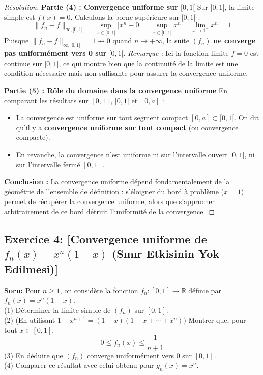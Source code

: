 \documentclass[12pt,a4paper]{report}
\begin{document}
\begin{proof}[Résolution]
\textbf{Partie (4) : Convergence uniforme sur $[0, 1[$}
Sur $[0, 1[$, la limite simple est $f(x) = 0$.
Calculons la borne supérieure sur $[0, 1[$ :
\[ \|f_n - f\|_{\infty, [0, 1[} = \sup_{x \in [0, 1[} |x^n - 0| = \sup_{x \in [0, 1[} x^n = \lim_{x \to 1^-} x^n = 1 \]
Puisque $\|f_n - f\|_{\infty, [0, 1[} = 1 \not\to 0$ quand $n \to +\infty$, la suite $(f_n)$ \textbf{ne converge pas uniformément vers 0 sur $[0, 1[$}.
\textit{Remarque :} Ici la fonction limite $f=0$ est continue sur $[0, 1[$, ce qui montre bien que la continuité de la limite est une condition nécessaire mais non suffisante pour assurer la convergence uniforme.

\textbf{Partie (5) : Rôle du domaine dans la convergence uniforme}
En comparant les résultats sur $[0, 1]$, $[0, 1[$ et $[0, a]$ :
\begin{itemize}
    \item La convergence est uniforme sur tout segment compact $[0, a] \subset [0, 1[$. On dit qu'il y a \textbf{convergence uniforme sur tout compact} (ou convergence compacte).
    \item En revanche, la convergence n'est uniforme ni sur l'intervalle ouvert $[0, 1[$, ni sur l'intervalle fermé $[0, 1]$.
\end{itemize}
\textbf{Conclusion :} La convergence uniforme dépend fondamentalement de la géométrie de l'ensemble de définition : s'éloigner du bord à problème ($x=1$) permet de récupérer la convergence uniforme, alors que s'approcher arbitrairement de ce bord détruit l'uniformité de la convergence.
\end{proof}

\subsection*{Exercice 4: [Convergence uniforme de $f_n(x) = x^n(1-x)$ (Sınır Etkisinin Yok Edilmesi)]}

\textbf{Soru:}
Pour $n \ge 1$, on considère la fonction $f_n : [0, 1] \to \mathbb{R}$ définie par $f_n(x) = x^n(1-x)$.\\
(1) Déterminer la limite simple de $(f_n)$ sur $[0, 1]$.\\
(2) (En utilisant $1 - x^{n+1} = (1-x)(1 + x + \cdots + x^n)$) Montrer que, pour tout $x \in [0, 1]$,
\[ 0 \le f_n(x) \le \frac{1}{n+1} \]
(3) En déduire que $(f_n)$ converge uniformément vers 0 sur $[0, 1]$.\\
(4) Comparer ce résultat avec celui obtenu pour $g_n(x) = x^n$.
\end{document}

